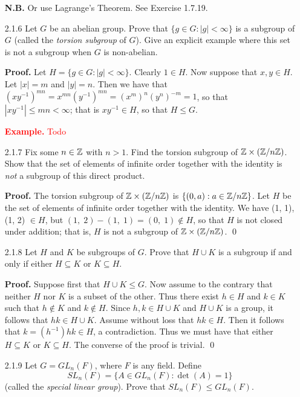 \begin{enumerate}
      \textbf{N.B.} Or use Lagrange's Theorem. See Exercise 1.7.19.
   \item[2.1.6]   Let $G$ be an abelian group. Prove that
                  $\{g \in G : |g| < \infty\}$ is a subgroup of $G$ (called the
                  \textit{torsion subgroup} of $G$). Give an explicit example
                  where this set is not a subgroup when $G$ is non-abelian.

      \textbf{Proof.} Let $H = \{g \in G : |g| < \infty\}$. Clearly $1 \in H$.
      Now suppose that $x, y \in H$. Let $|x| = m$ and $|y| = n$. Then we have
      that $(xy^{-1})^{mn} = x^{mn}(y^{-1})^{mn} = (x^m)^n(y^n)^{-m} = 1$, so 
      that $|xy^{-1}| \le mn < \infty$; that is $xy^{-1} \in H$, so that
      $H \le G$.

      \textcolor{red}{\textbf{Example.} Todo}
   \item[2.1.7]   Fix some $n \in \mathbb{Z}$ with $n > 1$. Find the torsion subgroup
                  of $\mathbb{Z} \times (\mathbb{Z}/n\mathbb{Z})$. Show that the set of elements of
                  infinite order together with the identity is \textit{not} a
                  subgroup of this direct product.

      \textbf{Proof.} The torsion subgroup of $\mathbb{Z} \times (\mathbb{Z}/n\mathbb{Z})$ is
      $\{(0, a) : a \in \mathbb{Z}/n\mathbb{Z}\}$. Let $H$ be the set of elements of infinite 
      order together with the identity. We have (1, 1), (1, 2) $\in H$, but
      $(1,\;2) - (1,\;1) = (0,\;1) \notin H$, so that $H$ is not closed under
      addition; that is, $H$ is not a subgroup of $\mathbb{Z} \times (\mathbb{Z}/n\mathbb{Z})$. \qed
   \item[2.1.8]   Let $H$ and $K$ be subgroups of $G$. Prove that $H \cup K$ is
                  a subgroup if and only if either $H \subseteq K$ or
                  $K \subseteq H$.

      \textbf{Proof.} Suppose first that $H \cup K \le G$. Now assume to the
      contrary that neither $H$ nor $K$ is a subset of the other. Thus there
      exist $h \in H$ and $k \in K$ such that $h \notin K$ and $k \notin H$.
      Since $h, k \in H \cup K$ and $H \cup K$ is a group, it follows that
      $hk \in H \cup K$. Assume without loss that $hk \in H$. Then it follows
      that $k = (h^{-1})hk \in H$, a contradiction. Thus we must have that
      either $H \subseteq K$ or $K \subseteq H$. The converse of the proof is 
      trivial. \qed
   \item[2.1.9]   Let $G = GL_n(F)$, where $F$ is any field. Define
                  $$SL_n(F) = \{A \in GL_n(F) : \det(A) = 1\}$$
                  (called the \textit{special linear group}). Prove that
                  $SL_n(F) \le GL_n(F)$.


\end{enumerate}
